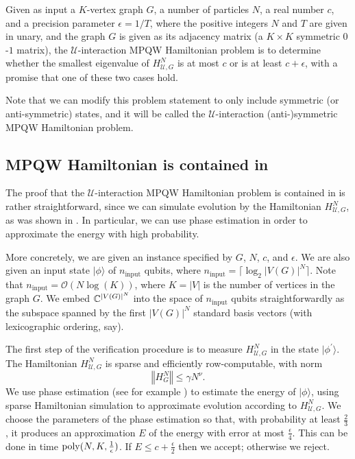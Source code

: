 \documentclass[../thesis-main/thesis-main]{subfiles}
\begin{document}
\begin{problem}
  Given as input a $K$-vertex graph $G$, a number of particles $N$, a real number $c$, and a precision parameter $\epsilon = 1/T$, where the positive integers $N$ and $T$ are given in unary, and the graph $G$ is given as its adjacency matrix (a $K\times K$ symmetric $0$-$1$ matrix), the $\mathcal{U}$-interaction MPQW Hamiltonian problem is to determine whether the smallest eigenvalue of $H_{\mathcal{U},G}^N$ is at most $c$ or is at least $c+\epsilon$, with a promise that one of these two cases hold.
\end{problem}

Note that we can modify this problem statement to only include symmetric (or anti-symmetric) states, and it will be called the $\mathcal{U}$-interaction (anti-)symmetric MPQW Hamiltonian problem.


\subsection{MPQW Hamiltonian is contained in \QMA}
\label{sec:containment_in_QMA}

The proof that the $\mathcal{U}$-interaction MPQW Hamiltonian problem is contained in \QMA is rather straightforward, since we can simulate evolution by the Hamiltonian $H_{\mathcal{U},G}^N$, as was shown in .  In particular, we can use phase estimation in order to approximate the energy with high probability.

More concretely, we are given an instance specified by $G$, $N$, $c$, and $\epsilon$. We are also given an input state $|\phi\rangle$ of $n_{\text{input}}$ qubits, where $n_{\text{input}}=\lceil \log_{2}|V(G)|^N\rceil $.  Note that $n_{\text{input}}=\mathcal{O}(N\log\left(K\right))$, where $K=|V|$ is the number of vertices in the graph $G$. We embed $\mathbb{C}^{|V(G)|^N}$ into the space of $n_{\text{input}}$ qubits straightforwardly as the subspace spanned by the first $|V(G)|^N$ standard basis vectors (with lexicographic ordering, say). 

The first step of the verification procedure is to measure $H_{\mathcal{U},G}^{N}$ in the state $|\phi^{\prime}\rangle$. The Hamiltonian $H_{\mathcal{U},G}^{N}$ is sparse and efficiently row-computable, with norm
\begin{equation}
  \left\Vert H_{G}^{N}\right\Vert \leq \gamma N^\nu.
\end{equation}
We use phase estimation (see for example \cite{CEMM98}) to estimate the energy of $|\phi\rangle$, using sparse Hamiltonian simulation \cite{AT03} to approximate evolution according to $H_{\mathcal{U},G}^{N}$. We choose the parameters of the phase estimation so that, with probability at least $\frac{2}{3}$, it produces an approximation $E$ of the energy with error at most $\frac{\epsilon}{4}$. This can be done in time $\operatorname{poly}(N,K,\frac{1}{\epsilon})$. If $E\leq c+\frac{\epsilon}{2}$ then we accept; otherwise we reject.
\end{document}
